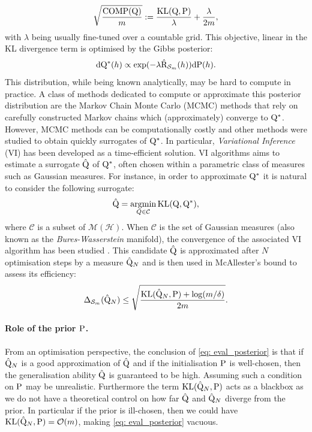 $$ \sqrt{\frac{\operatorname{COMP}(\Q)}{m}} := \frac{\operatorname{KL}(\Q,\P)}{\lambda} + \frac{\lambda}{2m},$$
with $\lambda$ being usually fine-tuned over a countable grid.
This objective, linear in the KL divergence term is optimised by the Gibbs posterior:
$$ \mathrm{d}\Q^*(h)\propto \exp(-\lambda \Riskhat_{\Sm}(h)) \mathrm{d}\P(h).$$
This distribution, while being known analytically, may be hard to compute in practice. A class of methods dedicated to compute or approximate this posterior distribution are the Markov Chain Monte Carlo (MCMC) methods that rely on carefully constructed Markov chains which (approximately) converge to $\Q^*$. However, MCMC methods can be computationally costly and other methods were studied to obtain quickly surrogates of $\Q^*$. In particular, \emph{Variational Inference} (VI) has been developed as a time-efficient solution. VI algorithms aims to estimate a surrogate $\hat{\Q}$ of $\Q^*$, often chosen within a parametric class of measures such as Gaussian measures. For instance, in order to approximate $\Q^*$ it is natural to consider the following surrogate:
$$ \hat{\Q} = \underset{Q\in \mathcal{C}}{\operatorname{argmin}} \operatorname{KL}(\Q,\Q^*) ,$$
where $\mathcal{C}$ is a subset of $\mathcal{M}(\mathcal{H})$. When $\mathcal{C}$ is the set of Gaussian measures (also known as the \emph{Bures-Wasserstein} manifold), the convergence of the associated VI algorithm has been studied \citep{altschuler2021aver,lambert2022variational}.
This candidate $\hat{\Q}$ is approximated after $N$ optimisation steps by a measure $\hat{\Q}_N$ and is then used in McAllester's bound to assess its efficiency:
\begin{align}
\label{eq: eval_posterior}
\Delta_{\Sm}(\hat{\Q}_N) \leq \sqrt{\frac{\operatorname{KL}(\hat{\Q}_N,\P) + \log(m/\delta)}{2m}}.
\end{align}

\paragraph{Role of the prior $\P$.}
From an optimisation perspective, the conclusion of \eqref{eq: eval_posterior} is that if $\hat{\Q}_N$ is a good approximation of $\hat{\Q}$ and if the initialisation $\P$ is well-chosen, then the generalisation ability $\hat{\Q}$ is guaranteed to be high. Assuming such a condition on $\P$ may be unrealistic. Furthermore the term $\operatorname{KL}(\hat{\Q}_N,\P)$ acts as a blackbox as we do not have a theoretical control on how far $\hat{\Q}$ and $\hat{\Q}_N$ diverge from the prior.
In particular if the prior is ill-chosen, then we could have $\operatorname{KL}(\hat{\Q}_N,\P) = \mathcal{O}(m)$, making \eqref{eq: eval_posterior} vacuous.


